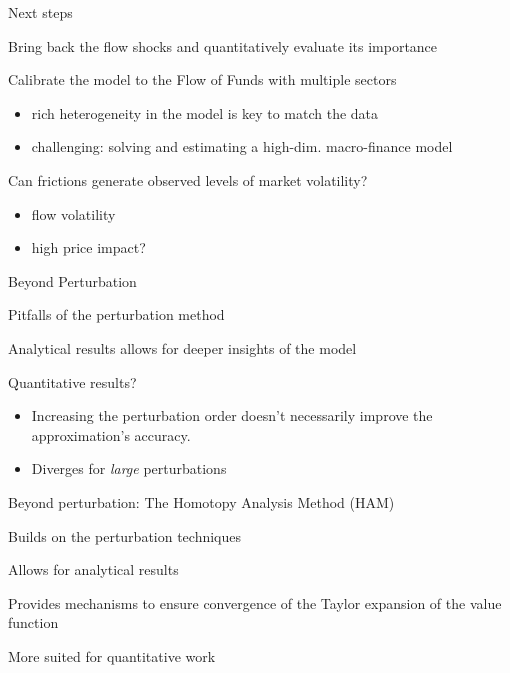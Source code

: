 \documentclass[12pt,aspectratio=169]{beamer}
\newenvironment{wideitemize}{\itemize\addtolength{\itemsep}{10pt}}{\enditemize}
\newcommand{\vspM}{\vspace{0.12truecm}}
\begin{document}
\begin{frame}{Next steps}
    \begin{wideitemize}
        \item Bring back the flow shocks and quantitatively evaluate its importance
        \item Calibrate the model to the Flow of Funds with multiple sectors
        \begin{itemize}
            \item rich heterogeneity in the model is key to match the data\vspM
            \item challenging: solving and estimating a high-dim. macro-finance model
        \end{itemize}
        \item Can frictions generate observed levels of market volatility?
        \begin{itemize}
            \item flow volatility\vspM
            \item high price impact?
        \end{itemize}
    \end{wideitemize}
\end{frame}

\begin{frame}[standout]
    Beyond Perturbation
\end{frame}


\begin{frame}{Pitfalls of the perturbation method}
    \begin{wideitemize}
      \item Analytical results allows for deeper insights of the model
      \item Quantitative results?
      \begin{itemize}
        \item Increasing the perturbation order doesn't necessarily improve the approximation's accuracy.\vspM
        \item Diverges for \textit{large} perturbations
      \end{itemize}
    \end{wideitemize}

  \end{frame}
  
\begin{frame}{Beyond perturbation: The Homotopy Analysis Method (HAM)}
    \begin{wideitemize}
      \item Builds on the perturbation techniques
      \item Allows for analytical results
      \item Provides mechanisms to ensure convergence of the Taylor expansion of the value function
      \item More suited for quantitative work
    \end{wideitemize}
\end{frame}
\end{document}
